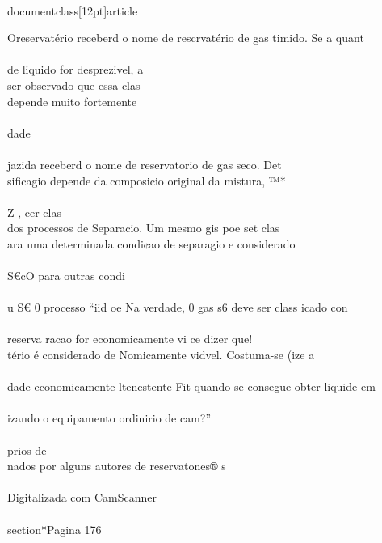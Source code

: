 \\documentclass[12pt]{article}
\begin{document}
Oreservatério receberd o nome de rescrvatério de gas timido. Se a quant\\
\\
de liquido for desprezivel, a\\
ser observado que essa clas\\
depende muito fortemente\\
\\
dade\\
\\
jazida receberd o nome de reservatorio de gas seco. Det\\
sificagio depende da composi¢io original da mistura, ™*\\
\\
Z , cer clas\\
dos processos de Separacio. Um mesmo gis poe set clas\\
ara uma determinada condi¢ao de separagio e considerado\\
\\
S€cO para outras condi\\
\\
u S€ 0 processo “iid oe Na verdade, 0 gas s6 deve ser class icado con\\
\\
reserva racao for economicamente vi ce dizer que!\\
tério é considerado de Nomicamente vidvel. Costuma-se (ize a\\
\\
dade economicamente ltencstente Fit quando se consegue obter liquide em\\
\\
izando o equipamento ordinirio de cam?” |\\
\\
prios de\\
nados por alguns autores de reservatones® s\\
\\
Digitalizada com CamScanner\\

\\section*{Pagina 176}
\end{document}
